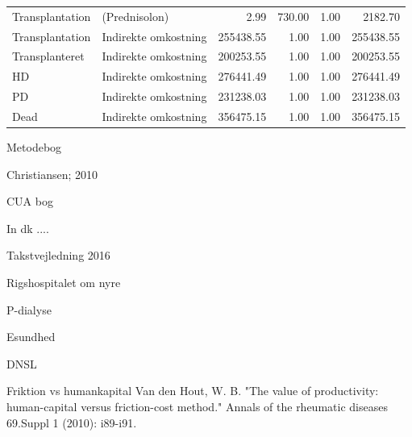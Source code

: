 \documentclass[a4paper,12pt]{article}
\begin{document}
\begin{adjustbox}{center}
\begin{tabular}{llrrrr}
		Transplantation & (Prednisolon) & 2.99 & 730.00 & 1.00 & 2182.70 \\ 
		Transplantation & Indirekte omkostning & 255438.55 & 1.00 & 1.00 & 255438.55 \\ 
		Transplanteret & Indirekte omkostning & 200253.55 & 1.00 & 1.00 & 200253.55 \\ 
		HD & Indirekte omkostning & 276441.49 & 1.00 & 1.00 & 276441.49 \\ 
		PD & Indirekte omkostning & 231238.03 & 1.00 & 1.00 & 231238.03 \\ 
		Dead & Indirekte omkostning & 356475.15 & 1.00 & 1.00 & 356475.15 \\ 
		\hline
	\end{tabular}

\end{adjustbox}



\newpage
\begin{thebibliography}{9}

Metodebog

Christiansen; 2010

CUA bog

In dk .... 

Takstvejledning 2016

Rigshospitalet om nyre

P-dialyse

Esundhed

DNSL

Friktion vs humankapital
Van den Hout, W. B. "The value of productivity: human-capital versus friction-cost method." Annals of the rheumatic diseases 69.Suppl 1 (2010): i89-i91.

\end{thebibliography}	
	
\end{document}
